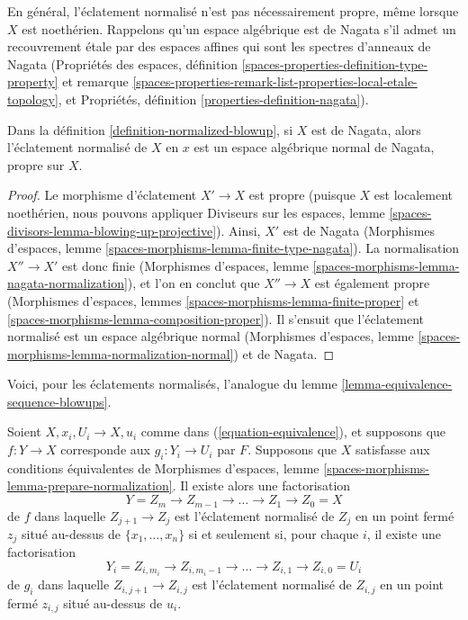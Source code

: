 \medskip\noindent
En général, l'éclatement normalisé n'est pas nécessairement propre, même
lorsque $X$ est noethérien. Rappelons qu'un espace algébrique est de Nagata
s'il admet un recouvrement étale par des espaces affines qui sont les spectres
d'anneaux de Nagata (Propriétés des espaces, définition
\ref{spaces-properties-definition-type-property} et
remarque \ref{spaces-properties-remark-list-properties-local-etale-topology},
et Propriétés, définition \ref{properties-definition-nagata}).

\begin{lemma}
\label{lemma-Nagata-normalized-blowup}
Dans la définition \ref{definition-normalized-blowup}, si $X$ est de Nagata,
alors l'éclatement normalisé de $X$ en $x$ est un espace algébrique normal
de Nagata, propre sur $X$.
\end{lemma}

\begin{proof}
Le morphisme d'éclatement $X' \to X$ est propre
(puisque $X$ est localement noethérien, nous pouvons appliquer
Diviseurs sur les espaces, lemme
\ref{spaces-divisors-lemma-blowing-up-projective}).
Ainsi, $X'$ est de Nagata (Morphismes d'espaces, lemme
\ref{spaces-morphisms-lemma-finite-type-nagata}).
La normalisation $X'' \to X'$ est donc finie (Morphismes d'espaces, lemme
\ref{spaces-morphisms-lemma-nagata-normalization}), et l'on en conclut que
$X'' \to X$ est également propre (Morphismes d'espaces, lemmes
\ref{spaces-morphisms-lemma-finite-proper} et
\ref{spaces-morphisms-lemma-composition-proper}).
Il s'ensuit que l'éclatement normalisé est un espace algébrique normal
(Morphismes d'espaces, lemme
\ref{spaces-morphisms-lemma-normalization-normal})
et de Nagata.
\end{proof}

\noindent
Voici, pour les éclatements normalisés, l'analogue du lemme
\ref{lemma-equivalence-sequence-blowups}.

\begin{lemma}
\label{lemma-equivalence-sequence-normalized-blowups}
Soient $X, x_i, U_i \to X, u_i$ comme dans
(\ref{equation-equivalence}), et supposons que $f : Y \to X$ corresponde aux
$g_i : Y_i \to U_i$ par $F$. Supposons que $X$ satisfasse aux conditions
équivalentes de Morphismes d'espaces, lemme
\ref{spaces-morphisms-lemma-prepare-normalization}.
Il existe alors une factorisation
$$
Y = Z_m \to Z_{m - 1} \to \ldots \to Z_1 \to Z_0 = X
$$
de $f$ dans laquelle $Z_{j + 1} \to Z_j$ est l'éclatement normalisé de $Z_j$
en un point fermé $z_j$ situé au-dessus de $\{x_1, \ldots, x_n\}$ si et
seulement si, pour chaque $i$, il existe une factorisation
$$
Y_i = Z_{i, m_i} \to Z_{i, m_i - 1} \to \ldots \to Z_{i, 1} \to Z_{i, 0} = U_i
$$
de $g_i$ dans laquelle $Z_{i, j + 1} \to Z_{i, j}$ est l'éclatement
normalisé de $Z_{i, j}$ en un point fermé $z_{i, j}$ situé au-dessus de $u_i$.
\end{lemma}

